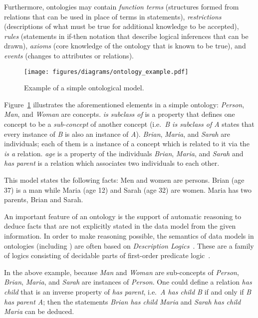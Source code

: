 Furthermore, ontologies may contain \emph{function terms} (structures formed from relations that can be used in place of terms in statements), \emph{restrictions} (descriptions of what must be true for additional knowledge to be accepted), \emph{rules} (statements in if-then notation that describe logical inferences that can be drawn), \emph{axioms} (core knowledge of the ontology that is known to be true), and \emph{events} (changes to attributes or relations).

\vspace{1em}

\begin{figure}
\centering
\texttt{[image: figures/diagrams/ontology\_example.pdf]}
\caption[Example of a simple ontological model]{Example of a simple ontological model.}
\label{fig:ontology_example}
\end{figure}

Figure~\ref{fig:ontology_example} illustrates the aforementioned elements in a simple ontology: \emph{Person}, \emph{Man}, and \emph{Woman} are concepts. \emph{is subclass of} is a property that defines one concept to be a \emph{sub-concept} of another concept (i.e.\ \emph{B is subclass of A} states that every instance of \emph{B} is also an instance of \emph{A}). \emph{Brian}, \emph{Maria}, and \emph{Sarah} are individuals; each of them is a instance of a concept which is related to it via the \emph{is a} relation. \emph{age} is a property of the individuals \emph{Brian}, \emph{Maria}, and \emph{Sarah} and \emph{has parent} is a relation which associates two individuals to each other.

This model states the following facts: Men and women are persons. Brian (age 37) is a man while Maria (age 12) and Sarah (age 32) are women. Maria has two parents, Brian and Sarah.

\vspace{1em}

An important feature of an ontology is the support of automatic reasoning to deduce facts that are not explicitly stated in the data model from the given information. In order to make reasoning possible, the semantics of data models in ontologies (including ) are often based on \emph{Description Logics}~\cite{OWL,SROIQ}. These are a family of logics consisting of decidable parts of first-order predicate logic~\cite{FirstOrderLogic}.

In the above example, because \emph{Man} and \emph{Woman} are sub-concepts of \emph{Person}, \emph{Brian}, \emph{Maria}, and \emph{Sarah} are instances of \emph{Person}. One could define a relation \emph{has child} that is an inverse property of \emph{has parent}, i.e.\ \emph{A has child B} if and only if \emph{B has parent A}; then the statements \emph{Brian has child Maria} and \emph{Sarah has child Maria} can be deduced.

